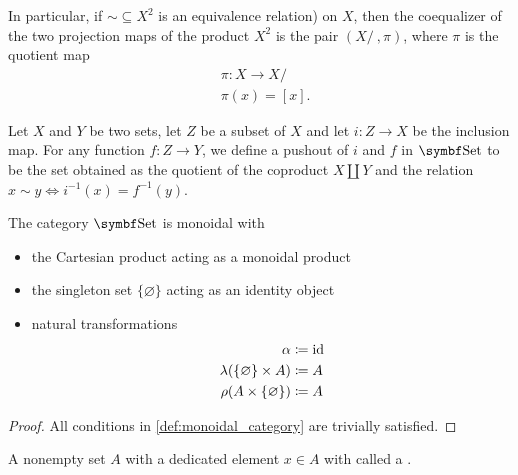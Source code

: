 \begin{proposition}
\begin{defenum}
    In particular, if \( \sim \subseteq X^2 \) is an equivalence relation) on \( X \), then the coequalizer of the two projection maps of the product \( X^2 \) is the pair \( (X / ~, \pi) \), where \( \pi \) is the quotient map
    \begin{align*}
      &\pi: X \to X / ~ \\
      &\pi(x) = [x].
    \end{align*}

     Let \( X \) and \( Y \) be two sets, let \( Z \) be a subset of \( X \) and let \( i: Z \to X \) be the inclusion map. For any function \( f: Z \to Y \), we define a pushout of \( i \) and \( f \) in \( \Cat{Set} \) to be the set obtained as the quotient of the coproduct \( X \coprod Y \) and the relation \( x \sim y \iff i^{-1}(x) = f^{-1}(y) \).
  \end{defenum}
\end{proposition}

\begin{proposition}\label{thm:set_is_monoidal}
  The category \( \Cat{Set} \) is monoidal with
  \begin{itemize}
    \item the Cartesian product acting as a monoidal product
    \item the singleton set \( \{ \varnothing \} \) acting as an identity object
    \item natural transformations
    \begin{align*}
      \alpha &\coloneqq \operatorname{id} \\
      \lambda(\{ \varnothing \} \times A) &\coloneqq A \\
      \rho(A \times \{ \varnothing \}) &\coloneqq A
    \end{align*}
  \end{itemize}
\end{proposition}
\begin{proof}
  All conditions in \cref{def:monoidal_category} are trivially satisfied.
\end{proof}

\begin{definition}\label{def:pointed_set}
  A nonempty set \( A \) with a dedicated element \( x \in A \) with called a .
\end{definition}
